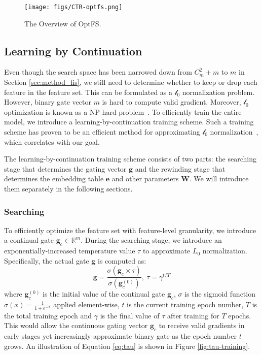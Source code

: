 \documentclass[sigconf]{acmart}
\begin{document}
\begin{figure}[!t]
    \centering
    \texttt{[image: figs/CTR-optfs.png]}
    \vspace{-10pt}
    \caption{The Overview of OptFS.}
    \vspace{-10pt}
    \label{fig:overall}
\end{figure}

\subsection{Learning by Continuation}
\label{sec:method_lbc}
Even though the search space has been narrowed down from $C^2_m + m$ to $m$ in Section \ref{sec:method_fis}, we still need to determine whether to keep or drop each feature in the feature set. This can be formulated as a $\mathcal{l}_0$ normalization problem. However, binary gate vector $m$ is hard to compute valid gradient. Moreover, $\mathcal{l}_0$ optimization is known as a NP-hard problem~\cite{l2norm}. To efficiently train the entire model, we introduce a learning-by-continuation training scheme. Such a training scheme has proven to be an efficient method for approximating $\mathcal{l}_0$ normalization~\cite{Cont_Spar}, which correlates with our goal.

The learning-by-continuation training scheme consists of two parts: the searching stage that determines the gating vector $\mathbf{g}$ and the rewinding stage that determines the embedding table $\mathbf{e}$ and other parameters $\mathbf{W}$. We will introduce them separately in the following sections.

\subsubsection{Searching}
To efficiently optimize the feature set with feature-level granularity, we introduce a continual gate $\mathbf{g}_c\in\mathbb{R}^{m}$. During the searching stage, we introduce an exponentially-increased temperature value $\tau$ to approximate $L_0$ normalization. Specifically, the actual gate $\mathbf{g}$ is computed as:
\begin{equation}
\label{eq:tau}
    \mathbf{g} = \frac{\sigma(\mathbf{g}_c \times \tau)}{\sigma(\mathbf{g}_c^{(0)})}, \ \tau = \gamma^{t/T}
\end{equation}
where $\mathbf{g}_c^{(0)}$ is the initial value of the continual gate $\mathbf{g}_c$, $\sigma$ is the sigmoid function $\sigma(x) = \frac{1}{1+e^{-x}}$ applied element-wise, $t$ is the current training epoch number, $T$ is the total training epoch and $\gamma$ is the final value of $\tau$ after training for $T$ epochs. This would allow the continuous gating vector $\mathbf{g}_c$ to receive valid gradients in early stages yet increasingly approximate binary gate as the epoch number $t$ grows. An illustration of Equation \ref{eq:tau} is shown in Figure \ref{fig:tau-training}.
\end{document}
